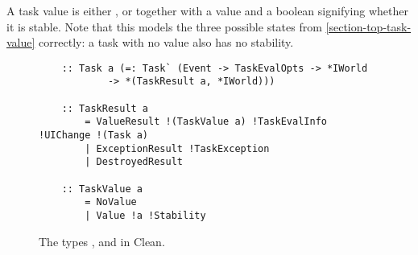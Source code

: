 A task value is either , or  together with a value and a boolean  signifying whether it is stable. Note that this models the three possible states from \ref{section-top-task-value} correctly: a task with no value also has no stability.

\begin{figure}[ht]
    \centering
    \begin{verbatim}
    :: Task a (=: Task` (Event -> TaskEvalOpts -> *IWorld
            -> *(TaskResult a, *IWorld)))
    
    :: TaskResult a
        = ValueResult !(TaskValue a) !TaskEvalInfo !UIChange !(Task a)
        | ExceptionResult !TaskException
        | DestroyedResult
    
    :: TaskValue a
        = NoValue
        | Value !a !Stability
    \end{verbatim}
    \caption{The types ,  and  in Clean.}
    \label{lst:clean_task_taskresult_types}
\end{figure}

